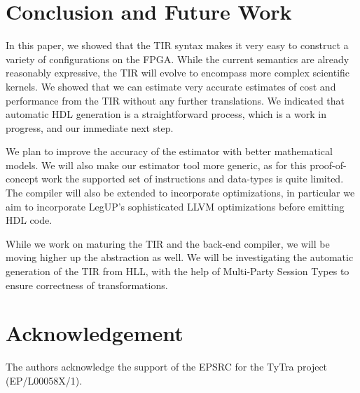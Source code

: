 \documentclass[]{heart2015_WN4Pre}
\begin{document}
\section{Conclusion and Future Work}

In this paper, we showed that the TIR syntax makes it very easy to construct a variety of configurations on the FPGA. While  the current semantics are already reasonably expressive,  the TIR will evolve to encompass more complex scientific kernels. We showed that we can estimate very accurate estimates of cost and performance from the TIR without any further translations. We indicated that automatic HDL generation is a straightforward process, which is a work in progress, and our immediate next step.

We plan to improve the accuracy of the estimator with better mathematical models. We will also  make our estimator tool more generic, as for this proof-of-concept work the supported set of instructions and data-types is quite limited. The compiler will also be extended to incorporate optimizations, in particular we aim to incorporate LegUP's  sophisticated LLVM  optimizations before emitting HDL code\cite{112.153}. 



While we work on maturing the TIR and the back-end compiler, we will be moving higher up the abstraction as well. We will be investigating the automatic generation of the TIR from HLL, with the help of Multi-Party Session Types to ensure correctness of transformations. 

\section*{Acknowledgement}
The authors acknowledge the support of the EPSRC for the TyTra project (EP/L00058X/1).

  
\end{document}
